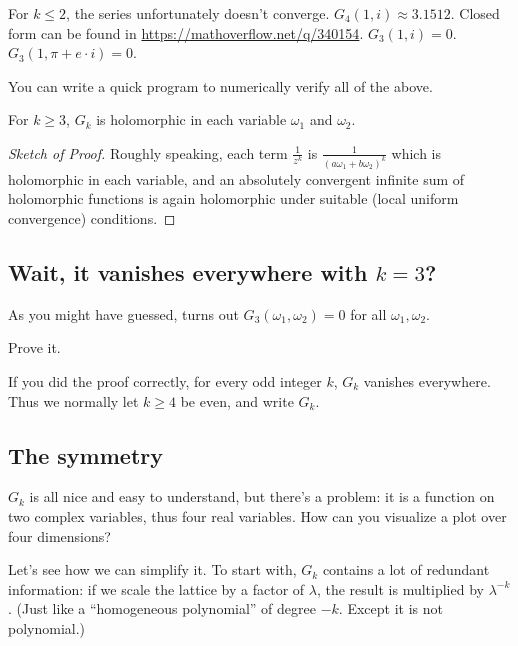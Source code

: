 \begin{example}
	\begin{itemize}
		\ii For $k \leq 2$, the series unfortunately doesn't converge.
		\ii $G_4(1, i) \approx 3.1512$.
		Closed form can be found in \url{https://mathoverflow.net/q/340154}.
		\ii $G_3(1, i) = 0$.
		\ii $G_3(1, \pi+e \cdot i) = 0$.
	\end{itemize}
\end{example}

You can write a quick program to numerically verify all of the above.

\begin{claim}
	For $k \geq 3$, $G_k$ is holomorphic in each variable $\omega_1$ and $\omega_2$.
\end{claim}
\begin{proof}[Sketch of Proof]
	Roughly speaking, each term $\frac{1}{z^k}$ is $\frac{1}{(a \omega_1+b \omega_2)^k}$
	which is holomorphic in each variable,
	and an absolutely convergent infinite sum of holomorphic functions
	is again holomorphic under suitable (local uniform convergence) conditions.
\end{proof}

\subsection{Wait, it vanishes everywhere with $k=3$?}

As you might have guessed, turns out $G_3(\omega_1, \omega_2) = 0$ for all $\omega_1, \omega_2$.
\begin{exercise}
	Prove it.
\end{exercise}

If you did the proof correctly, for every odd integer $k$, $G_k$ vanishes everywhere.
Thus we normally let $k \geq 4$ be even, and write $G_k$.

\subsection{The symmetry}

$G_k$ is all nice and easy to understand, but there's a problem: it is a function on two complex
variables, thus four real variables. How can you visualize a plot over four dimensions?

Let's see how we can simplify it. To start with, $G_k$ contains a lot of redundant information:
if we scale the lattice by a factor of $\lambda$, the result is multiplied by $\lambda^{-k}$.
(Just like a ``homogeneous polynomial'' of degree $-k$. Except it is not polynomial.)

